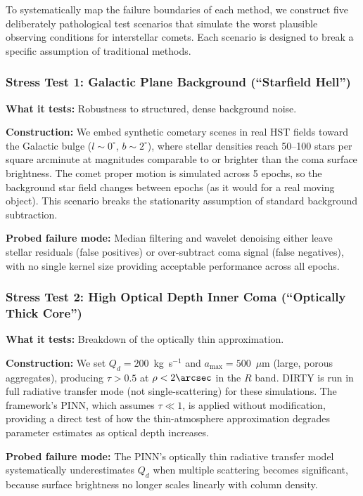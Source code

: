 \documentclass[usenatbib]{mnras}
\begin{document}
To systematically map the failure boundaries of each method, we construct five deliberately pathological test scenarios that simulate the worst plausible observing conditions for interstellar comets. Each scenario is designed to break a specific assumption of traditional methods.

\subsubsection{Stress Test 1: Galactic Plane Background (``Starfield Hell'')}

\textbf{What it tests:} Robustness to structured, dense background noise.

\textbf{Construction:} We embed synthetic cometary scenes in real HST fields toward the Galactic bulge ($l \sim 0^\circ$, $b \sim 2^\circ$), where stellar densities reach 50--100 stars per square arcminute at magnitudes comparable to or brighter than the coma surface brightness. The comet proper motion is simulated across 5 epochs, so the background star field changes between epochs (as it would for a real moving object). This scenario breaks the stationarity assumption of standard background subtraction.

\textbf{Probed failure mode:} Median filtering and wavelet denoising either leave stellar residuals (false positives) or over-subtract coma signal (false negatives), with no single kernel size providing acceptable performance across all epochs.

\subsubsection{Stress Test 2: High Optical Depth Inner Coma (``Optically Thick Core'')}

\textbf{What it tests:} Breakdown of the optically thin approximation.

\textbf{Construction:} We set $Q_d = 200$~kg~s$^{-1}$ and $a_{\max} = 500$~$\mu$m (large, porous aggregates), producing $\tau > 0.5$ at $\rho < 2\arcsec$ in the $R$ band. DIRTY is run in full radiative transfer mode (not single-scattering) for these simulations. The framework's PINN, which assumes $\tau \ll 1$, is applied without modification, providing a direct test of how the thin-atmosphere approximation degrades parameter estimates as optical depth increases.

\textbf{Probed failure mode:} The PINN's optically thin radiative transfer model systematically underestimates $Q_d$ when multiple scattering becomes significant, because surface brightness no longer scales linearly with column density.
\end{document}
